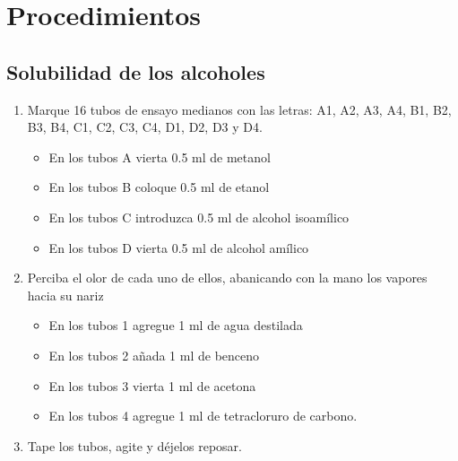 \section{Procedimientos}

\subsection{Solubilidad de los alcoholes}

\begin{enumerate}
    \item Marque 16 tubos de ensayo medianos con las letras: A1, A2, A3, A4, B1, B2, B3, B4, C1, C2, C3, C4, D1, D2, D3 y D4.
    \begin{itemize}
        \item En los tubos A vierta 0.5 ml de metanol
        \item En los tubos B coloque 0.5 ml de etanol
        \item En los tubos C introduzca 0.5 ml de alcohol isoamílico
        \item En los tubos D vierta 0.5 ml de alcohol amílico
    \end{itemize}
    
    \item Perciba el olor de cada uno de ellos, abanicando con la mano los vapores hacia su nariz
    \begin{itemize}
        \item En los tubos 1 agregue 1 ml de agua destilada
        \item En los tubos 2 añada 1 ml de benceno
        \item En los tubos 3 vierta 1 ml de acetona
        \item En los tubos 4 agregue 1 ml de tetracloruro de carbono.
    \end{itemize}
    
    \item Tape los tubos, agite y déjelos reposar.
\end{enumerate}